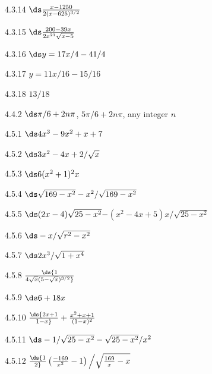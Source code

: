 \begin{Answer}{4.3.14}
$\ds \frac{x-1250}{2(x-625)^{3/2}}$
\end{Answer}
\begin{Answer}{4.3.15}
$\ds \frac{200-39x}{2x^{21}\sqrt{x-5}}$
\end{Answer}
\begin{Answer}{4.3.16}
$\ds y=17x/4-41/4$
\end{Answer}
\begin{Answer}{4.3.17}
$y=11x/16-15/16$
\end{Answer}
\begin{Answer}{4.3.18}
$13/18$
\end{Answer}
\begin{Answer}{4.4.2}
$\ds \pi/6+2n\pi$, $5\pi/6+2n\pi$, any integer $n$
\end{Answer}
\begin{Answer}{4.5.1}
$\ds 4x^3-9x^2+x+7$
\end{Answer}
\begin{Answer}{4.5.2}
$\ds 3x^2-4x+2/\sqrt{x}$
\end{Answer}
\begin{Answer}{4.5.3}
$\ds 6(x^2+1)^2x$
\end{Answer}
\begin{Answer}{4.5.4}
$\ds \sqrt{169-x^2}-x^2/\sqrt{169-x^2}$
\end{Answer}
\begin{Answer}{4.5.5}
$\ds  (2x-4)\sqrt{25-x^2}-$\hfill\break$(x^2-4x+5)x/\sqrt{25-x^2}$
\end{Answer}
\begin{Answer}{4.5.6}
$\ds -x/\sqrt{r^2-x^2}$
\end{Answer}
\begin{Answer}{4.5.7}
$\ds 2x^3/\sqrt{1+x^4}$
\end{Answer}
\begin{Answer}{4.5.8}
$\ds{1\over 4\sqrt{x}(5-\sqrt{x})^{3/2}}$
\end{Answer}
\begin{Answer}{4.5.9}
$\ds  6+18x$
\end{Answer}
\begin{Answer}{4.5.10}
$\ds {2 x + 1\over1 - x }+{x^2  + x + 1\over(1 - x)^2}$
\end{Answer}
\begin{Answer}{4.5.11}
$\ds  -1/\sqrt{25-x^2}-\sqrt{25-x^2}/x^2$
\end{Answer}
\begin{Answer}{4.5.12}
$\ds{1\over2}\left({-169\over x^2}-1\right)\Big/\sqrt{{169\over x}-x}$
\end{Answer}

